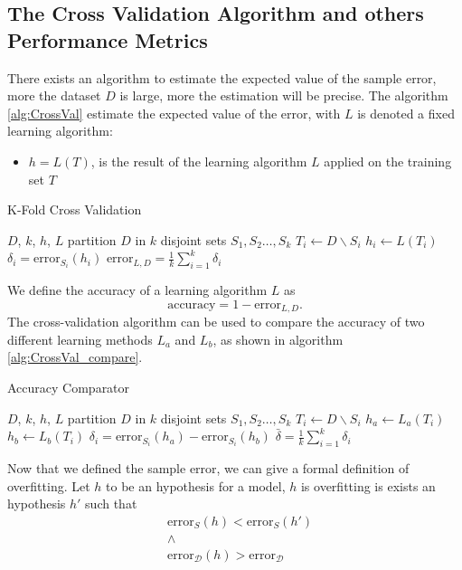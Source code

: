 \documentclass[10pt, letterpaper]{report}
\begin{document}
\subsection{The Cross Validation Algorithm and others Performance Metrics}
There exists an algorithm to estimate the expected value of the sample error, more the dataset $D$ is large, more the estimation will be precise.
The algorithm \ref{alg:CrossVal} estimate the expected value of the error, with $L$ is denoted a fixed learning algorithm:\begin{itemize}
	\item $h=L(T)$, is the result of the learning algorithm $L$ applied on the training set $T$
\end{itemize}
\begin{algorithm}
	\caption{K-Fold Cross Validation}\label{alg:CrossVal}
	\begin{algorithmic}
		\Require $D$, $k$, $h$, $L$
		\State partition $D$ in $k$ disjoint sets $S_1,S_2\dots, S_k$
		\State $T_i\leftarrow  D\backslash S_i$
		\State $h_i\leftarrow L(T_i) $
		\State $\delta_i = \text{error}_{S_i}(h_i)$
		\EndFor
		\State\Return $\text{error}_{L,D}=\displaystyle\frac{1}{k}\sum_{i=1}^k\delta_i$
	\end{algorithmic}
\end{algorithm}
We define the accuracy of a learning algorithm $L$ as \begin{equation}
	\text{accuracy}=1-\text{error}_{L,D}.
\end{equation}
The cross-validation algorithm can be used to compare the accuracy of two different learning methods $L_a$ and $L_b$, as shown in algorithm \ref{alg:CrossVal_compare}.

\begin{algorithm}
	\caption{Accuracy Comparator}\label{alg:CrossVal_compare}
	\begin{algorithmic}
		\Require $D$, $k$, $h$, $L$
		\State partition $D$ in $k$ disjoint sets $S_1,S_2\dots, S_k$
		\For{$i=1,2\dots,k$}
		\State $T_i\leftarrow  D\backslash S_i$
		\State $h_a\leftarrow L_a(T_i) $
		\State $h_b\leftarrow L_b(T_i) $
		\State $\delta_i = \text{error}_{S_i}(h_a)-\text{error}_{S_i}(h_b)$
		\EndFor
		\State\Return $\bar\delta=\displaystyle\frac{1}{k}\sum_{i=1}^k\delta_i$
	\end{algorithmic}
\end{algorithm}

Now that we defined the sample error, we can give a formal definition of overfitting. Let $h$  to be an hypothesis for a model, $h$ is overfitting is exists an hypothesis $h'$ such that\begin{align}
	 & \text{error}_{S}(h)<\text{error}_{S}(h')               \\ &\land\\
	 & \text{error}_{\mathcal D}(h)>\text{error}_{\mathcal D}
\end{align}
\end{document}
